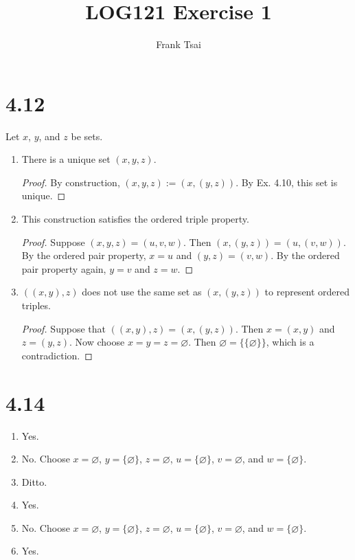 \documentclass[a4paper]{article}
\title{LOG121 Exercise 1}
\author{Frank Tsai}
\begin{document}
\maketitle

\section{4.12}
Let $x$, $y$, and $z$ be sets.
\begin{enumerate}
\item There is a unique set $(x,y,z)$.
  \begin{proof}
    By construction, $(x,y,z) := (x,(y,z))$.
    By Ex. 4.10, this set is unique. \qedhere
  \end{proof}
\item This construction satisfies the ordered triple property.
  \begin{proof}
    Suppose $(x,y,z) = (u,v,w)$.
    Then $(x,(y,z)) = (u,(v,w))$.
    By the ordered pair property, $x = u$ and $(y,z) = (v,w)$.
    By the ordered pair property again, $y = v$ and $z = w$.
  \end{proof}
\item $((x,y),z)$ does not use the same set as $(x,(y,z))$ to represent ordered triples.
  \begin{proof}
    Suppose that $((x,y),z) = (x,(y,z))$.
    Then $x = (x,y)$ and $z = (y,z)$.
    Now choose $x = y = z = \varnothing$.
    Then $\varnothing = \{\{\varnothing\}\}$, which is a contradiction.
  \end{proof}
\end{enumerate}

\section{4.14}
\begin{enumerate}
\item Yes.
\item No. Choose $x = \varnothing$, $y = \{\varnothing\}$, $z = \varnothing$, $u = \{\varnothing\}$, $v = \varnothing$, and $w = \{\varnothing\}$.
\item Ditto.
\item Yes.
\item No. Choose $x = \varnothing$, $y = \{\varnothing\}$, $z = \varnothing$, $u = \{\varnothing\}$, $v = \varnothing$, and $w = \{\varnothing\}$.
\item Yes.
\end{enumerate}

\end{document}
